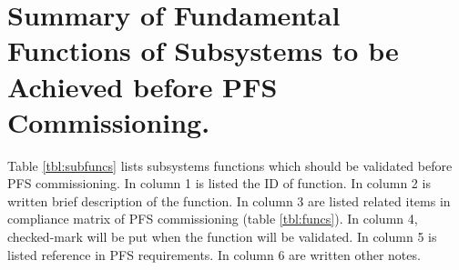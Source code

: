

\section{Summary of Fundamental Functions of Subsystems to be Achieved before PFS Commissioning.}
Table \ref{tbl:subfuncs} lists subsystems functions which should be validated before PFS commissioning.
In column 1 is listed the ID of function.
In column 2 is written brief description of the function.
In column 3 are listed related items in compliance matrix of PFS commissioning (table \ref{tbl:funcs}).
In column 4, checked-mark will be put when the function will be validated.
In column 5 is listed reference in PFS requirements.
In column 6 are written other notes.


